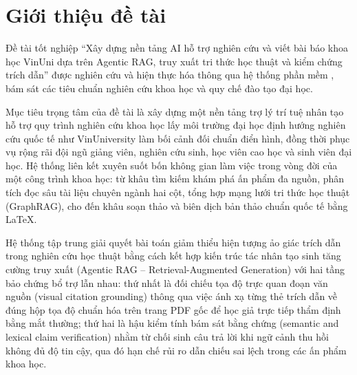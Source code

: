 \section{Giới thiệu đề tài}
\label{sec:gioi_thieu}
Đề tài tốt nghiệp ``Xây dựng nền tảng AI hỗ trợ nghiên cứu và viết bài báo khoa học VinUni dựa trên Agentic RAG, truy xuất tri thức học thuật và kiểm chứng trích dẫn'' được nghiên cứu và hiện thực hóa thông qua hệ thống phần mềm \VS, bám sát các tiêu chuẩn nghiên cứu khoa học và quy chế đào tạo đại học.

Mục tiêu trọng tâm của đề tài là xây dựng một nền tảng trợ lý trí tuệ nhân tạo hỗ trợ quy trình nghiên cứu khoa học lấy môi trường đại học định hướng nghiên cứu quốc tế như VinUniversity làm bối cảnh đối chuẩn điển hình, đồng thời phục vụ rộng rãi đội ngũ giảng viên, nghiên cứu sinh, học viên cao học và sinh viên đại học. Hệ thống liên kết xuyên suốt bốn không gian làm việc trong vòng đời của một công trình khoa học: từ khâu tìm kiếm khám phá ấn phẩm đa nguồn, phân tích đọc sâu tài liệu chuyên ngành hai cột, tổng hợp mạng lưới tri thức học thuật (GraphRAG), cho đến khâu soạn thảo và biên dịch bản thảo chuẩn quốc tế bằng LaTeX.

Hệ thống \VS tập trung giải quyết bài toán giảm thiểu hiện tượng ảo giác trích dẫn trong nghiên cứu học thuật bằng cách kết hợp kiến trúc tác nhân tạo sinh tăng cường truy xuất (Agentic RAG -- Retrieval-Augmented Generation) với hai tầng bảo chứng bổ trợ lẫn nhau: thứ nhất là đối chiếu tọa độ trực quan đoạn văn nguồn (visual citation grounding) thông qua việc ánh xạ từng thẻ trích dẫn về đúng hộp tọa độ chuẩn hóa trên trang PDF gốc để học giả trực tiếp thẩm định bằng mắt thường; thứ hai là hậu kiểm tính bám sát bằng chứng (semantic and lexical claim verification) nhằm từ chối sinh câu trả lời khi ngữ cảnh thu hồi không đủ độ tin cậy, qua đó hạn chế rủi ro dẫn chiếu sai lệch trong các ấn phẩm khoa học.
